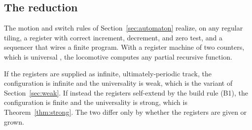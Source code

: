 \subsection{The reduction}

\begin{proposition}[Assembly]
\label{prop:assembly}
The motion and switch rules of Section~\ref{sec:automaton} realize, on any regular tiling, a register with
correct increment, decrement, and zero test, and a sequencer that wires a finite program. With a register
machine of two counters, which is universal \cite{minsky1967}, the locomotive computes any partial recursive
function.
\end{proposition}

If the registers are supplied as infinite, ultimately-periodic track, the configuration is infinite and the
universality is weak, which is the variant of Section~\ref{sec:weak}. If instead the registers self-extend by
the build rule (B1), the configuration is finite and the universality is strong, which is
Theorem~\ref{thm:strong}. The two differ only by whether the registers are given or grown.
